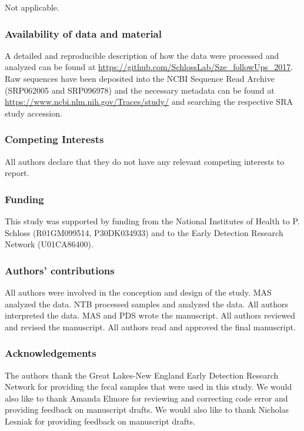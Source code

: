 \documentclass[12pt,]{article}
\begin{document}
Not applicable.

\subsubsection{Availability of data and
material}\label{availability-of-data-and-material}

A detailed and reproducible description of how the data were processed
and analyzed can be found at
\url{https://github.com/SchlossLab/Sze_followUps_2017}. Raw sequences
have been deposited into the NCBI Sequence Read Archive (SRP062005 and
SRP096978) and the necessary metadata can be found at
\url{https://www.ncbi.nlm.nih.gov/Traces/study/} and searching the
respective SRA study accession.

\subsubsection{Competing Interests}\label{competing-interests}

All authors declare that they do not have any relevant competing
interests to report.

\subsubsection{Funding}\label{funding}

This study was supported by funding from the National Institutes of
Health to P. Schloss (R01GM099514, P30DK034933) and to the Early
Detection Research Network (U01CA86400).

\subsubsection{Authors' contributions}\label{authors-contributions}

All authors were involved in the conception and design of the study. MAS
analyzed the data. NTB processed samples and analyzed the data. All
authors interpreted the data. MAS and PDS wrote the manuscript. All
authors reviewed and revised the manuscript. All authors read and
approved the final manuscript.

\subsubsection{Acknowledgements}\label{acknowledgements}

The authors thank the Great Lakes-New England Early Detection Research
Network for providing the fecal samples that were used in this study. We
would also like to thank Amanda Elmore for reviewing and correcting code
error and providing feedback on manuscript drafts. We would also like to
thank Nicholas Lesniak for providing feedback on manuscript drafts.
\end{document}
